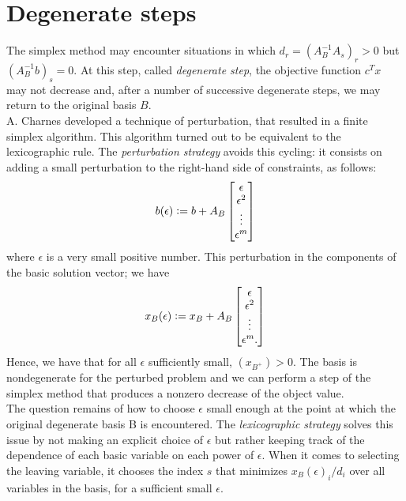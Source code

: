 \documentclass[a4paper,10 pt,titlepage,twoside]{book}
\theoremstyle{plain}
\theoremstyle{definition}
\theoremstyle{remark}
\begin{document}
 \section{Degenerate steps}
The simplex method may encounter situations in which $d_{r} = \left( A_{B}^{-1}A_{s}\right)_{r} > 0$ but $(A_{B}^{-1}b)_{s}= 0$. At this step, called \textit{degenerate step}, the objective function $c^{T}x$ may not decrease and, after a number of successive degenerate steps, we may return to the original basis $B$. \\
A. Charnes \cite{Lexico2} developed a technique of perturbation, that resulted in a finite simplex algorithm. This algorithm turned out to be equivalent to the lexicographic rule. The \textit{perturbation strategy} avoids this cycling: it consists on adding a small perturbation to the right-hand side of constraints, as follows:
\begin{equation*}
b(\epsilon) \vcentcolon= b + A_{B}
\begin{bmatrix}
\epsilon\\\epsilon^{2}\\\vdots\\\epsilon^{m}
\end{bmatrix}
\end{equation*}
where $\epsilon$ is a very small positive number. This perturbation in the components of the basic solution vector; we have
\begin{equation*}x_{B}(\epsilon) \vcentcolon= x_{B} + A_{B}
\begin{bmatrix}
\epsilon\\\epsilon^{2}\\\vdots\\\epsilon^{m}.
\end{bmatrix}
\end{equation*}
Hence, we have that for all $\epsilon$ sufficiently small, $(x_{B^{+}})>0$. The basis is nondegenerate for the perturbed problem and we can perform a step of the simplex method that produces a nonzero decrease of the object value.\\
The question remains of how to choose $\epsilon$ small enough at the point at which the original degenerate basis B is encountered. The \textit{lexicographic strategy} solves this issue by not making an explicit choice of $\epsilon$ but rather keeping track of the dependence of each basic variable on each power of $\epsilon$. When it comes to selecting the leaving variable, it chooses the index $s$ that minimizes $x_{B}(\epsilon)_{i}/d_{i}$ over all variables in the basis, for a sufficient small $\epsilon$.\\
\end{document}
